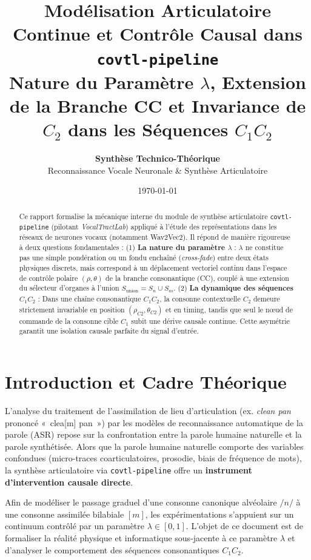 \documentclass[11pt,a4paper]{article}
\title{\vspace{-1cm}
\Huge \textbf{\textcolor{primary}{Modélisation Articulatoire Continue et Contrôle Causal dans \texttt{covtl-pipeline}}}\\
\Large \vspace{0.3cm} \textcolor{secondary}{Nature du Paramètre $\lambda$, Extension de la Branche CC et Invariance de $C_2$ dans les Séquences $C_1 C_2$}
}
\author{\textbf{Synthèse Technico-Théorique} \\ Reconnaissance Vocale Neuronale \& Synthèse Articulatoire}
\date{\today}
\begin{document}
\maketitle

\begin{abstract}
\noindent Ce rapport formalise la mécanique interne du module de synthèse articulatoire \texttt{covtl-pipeline} (pilotant \textit{VocalTractLab}) appliqué à l'étude des représentations dans les réseaux de neurones vocaux (notamment Wav2Vec2). Il répond de manière rigoureuse à deux questions fondamentales :
(1) \textbf{La nature du paramètre $\lambda$} : $\lambda$ ne constitue pas une simple pondération ou un fondu enchaîné (\textit{cross-fade}) entre deux états physiques discrets, mais correspond à un déplacement vectoriel continu dans l'espace de contrôle polaire $(\rho, \theta)$ de la branche consonantique (CC), couplé à une extension du sélecteur d'organes à l'union $S_{\text{union}} = S_n \cup S_m$.
(2) \textbf{La dynamique des séquences $C_1 C_2$} : Dans une chaîne consonantique $C_1 C_2$, la consonne contextuelle $C_2$ demeure strictement invariable en position $(\rho_{C2}, \theta_{C2})$ et en timing, tandis que seul le nœud de commande de la consonne cible $C_1$ subit une dérive causale continue. Cette asymétrie garantit une isolation causale parfaite du signal d'entrée.
\end{abstract}

\vspace{0.3cm}

\section{Introduction et Cadre Théorique}

L'analyse du traitement de l'assimilation de lieu d'articulation (ex. \textit{clean pan} prononcé «~clea[m] pan~») par les modèles de reconnaissance automatique de la parole (ASR) repose sur la confrontation entre la parole humaine naturelle et la parole synthétisée. Alors que la parole humaine naturelle comporte des variables confondues (micro-traces coarticulatoires, prosodie, biais de fréquence de mots), la synthèse articulatoire via \texttt{covtl-pipeline} offre un \textbf{instrument d'intervention causale directe}.

Afin de modéliser le passage graduel d'une consonne canonique alvéolaire $/n/$ à une consonne assimilée bilabiale $[m]$, les expérimentations s'appuient sur un continuum contrôlé par un paramètre $\lambda \in [0, 1]$. L'objet de ce document est de formaliser la réalité physique et informatique sous-jacente à ce paramètre $\lambda$ et d'analyser le comportement des séquences consonantiques $C_1 C_2$.
\end{document}
